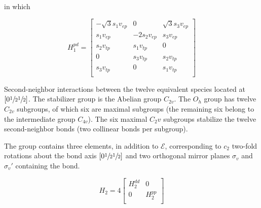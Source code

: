 \documentclass[twocolumn,showpacs,preprintnumbers,superscriptaddress,prb,floatfix,aps,10pt]{revtex4-1}
\newcommand*{\id}{\mathcal{E}}
\begin{document}
in which 

\begin{equation}
H_1^{pd} = 
\begin{bmatrix}
-\sqrt{3} s_1 v_{ep} & 0            & \sqrt{3} s_3 v_{ep}  \\ %
 s_1 v_{ep}          &-2 s_2 v_{ep} &  s_3 v_{ep}          \\ %
 s_2 v_{tp}          &  s_1 v_{tp}  & 0                    \\
0                    &  s_3 v_{tp}  &  s_2 v_{tp}          \\
 s_3 v_{tp}          & 0            &  s_1 v_{tp}          \\
\end{bmatrix}
\end{equation}

Second-neighbor interactions between the twelve equivalent species located at $\left[0\sfrac{1}{2}\sfrac{1}{2}\right]$. The stabilizer group is the Abelian group $C_{2v}$. The $O_h$ group has twelve $C_{2v}$ subgroups, of which six are maximal subgroups (the remaining six belong to the intermediate group $C_{4v}$). \cite{wadhawan_introduction_2000} The six maximal $C_2v$ subgroups stabilize the twelve second-neighbor bonds (two collinear bonds per subgroup). 

The group contains three elements, in addition to $\id$, corresponding to $c_2$ two-fold rotations about the bond axis $\left[0\sfrac{1}{2}\sfrac{1}{2}\right]$ and two orthogonal mirror planes $\sigma_v$ and $\sigma_v'$ containing the bond.


\begin{equation}
H_2 = 4
\begin{bmatrix}
H_2^{dd} & 0 \\
 0 & H_2^{pp} \\
\end{bmatrix}
\end{equation}
\end{document}
